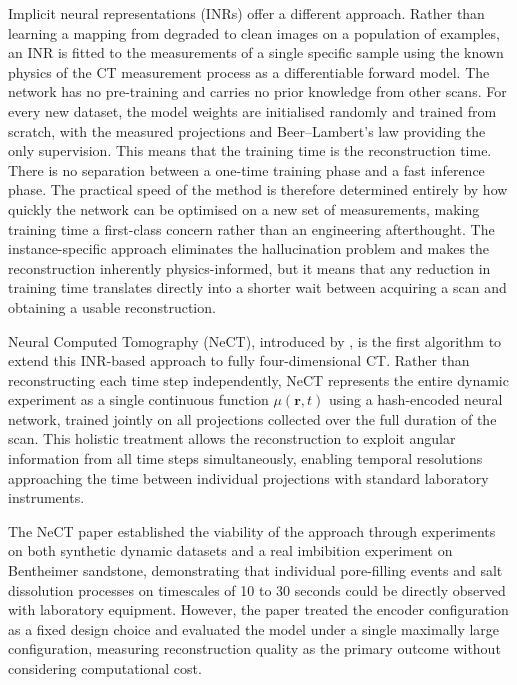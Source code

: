 \documentclass[12pt, a4paper, twoside]{report}
\begin{document}
Implicit neural representations (INRs) offer a different approach. Rather than learning a mapping from degraded to clean images on a population of examples, an INR is fitted to the measurements of a single specific sample using the known physics of the CT measurement process as a differentiable forward model. The network has no pre-training and carries no prior knowledge from other scans. For every new dataset, the model weights are initialised randomly and trained from scratch, with the measured projections and Beer--Lambert's law providing the only supervision. This means that the training time is the reconstruction time. There is no separation between a one-time training phase and a fast inference phase. The practical speed of the method is therefore determined entirely by how quickly the network can be optimised on a new set of measurements, making training time a first-class concern rather than an engineering afterthought. The instance-specific approach eliminates the hallucination problem and makes the reconstruction inherently physics-informed, but it means that any reduction in training time translates directly into a shorter wait between acquiring a scan and obtaining a usable reconstruction.

Neural Computed Tomography (NeCT), introduced by \citet{friis2025nect}, is the first algorithm to extend this INR-based approach to fully four-dimensional CT. Rather than reconstructing each time step independently, NeCT represents the entire dynamic experiment as a single continuous function $\mu(\mathbf{r}, t)$ using a hash-encoded neural network, trained jointly on all projections collected over the full duration of the scan. This holistic treatment allows the reconstruction to exploit angular information from all time steps simultaneously, enabling temporal resolutions approaching the time between individual projections with standard laboratory instruments.

The NeCT paper established the viability of the approach through experiments on both synthetic dynamic datasets and a real imbibition experiment on Bentheimer sandstone, demonstrating that individual pore-filling events and salt dissolution processes on timescales of 10 to 30 seconds could be directly observed with laboratory equipment. However, the paper treated the encoder configuration as a fixed design choice and evaluated the model under a single maximally large configuration, measuring reconstruction quality as the primary outcome without considering computational cost.
\end{document}
